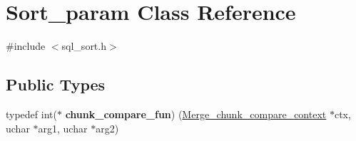 \hypertarget{classSort__param}{}\section{Sort\+\_\+param Class Reference}
\label{classSort__param}


{\ttfamily \#include $<$sql\+\_\+sort.\+h$>$}

\subsection*{Public Types}
\begin{DoxyCompactItemize}
\item 
\mbox{\label{classSort__param_abed9faa9fcd10fd1fc245a1db9e3ad35}} 
typedef int($\ast$ {\bfseries chunk\+\_\+compare\+\_\+fun}) (\mbox{\hyperlink{structMerge__chunk__compare__context}{Merge\+\_\+chunk\+\_\+compare\+\_\+context}} $\ast$ctx, uchar $\ast$arg1, uchar $\ast$arg2)
\end{DoxyCompactItemize}
